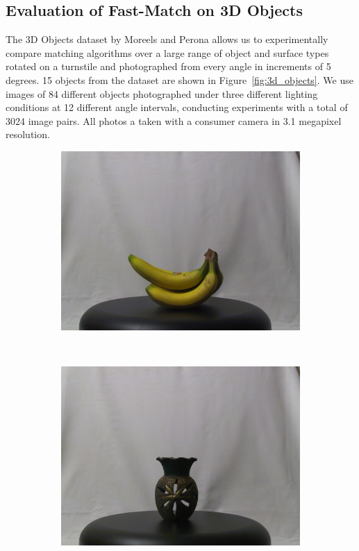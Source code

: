 \documentclass[10pt,twocolumn,letterpaper]{article}
\begin{document}
\subsection{Evaluation of Fast-Match on 3D Objects}
\label{3dobjects}
%
The 3D Objects dataset by Moreels and Perona \cite{moreels2007evaluation} allows us to experimentally compare matching algorithms over a large range of object and surface types rotated on a turnstile and photographed from every angle in increments of 5 degrees. 15 objects from the dataset are shown in Figure~\ref{fig:3d_objects}.  We use images of 84 different objects photographed under three different lighting conditions at 12 different angle intervals, conducting experiments with a total of 3024 image pairs. All photos a taken with a consumer camera in 3.1 megapixel resolution.

\begin{figure}[htb]
    \centering
    \begin{subfigure}[t]{0.15\columnwidth}
        \centering
        \includegraphics[width=1\columnwidth]{images/3d/1}
    \end{subfigure}%
    ~ %
    \begin{subfigure}[t]{0.15\columnwidth}
        \centering
        \includegraphics[width=1\columnwidth]{images/3d/2}

\end{subfigure}
\end{figure}
\end{document}

